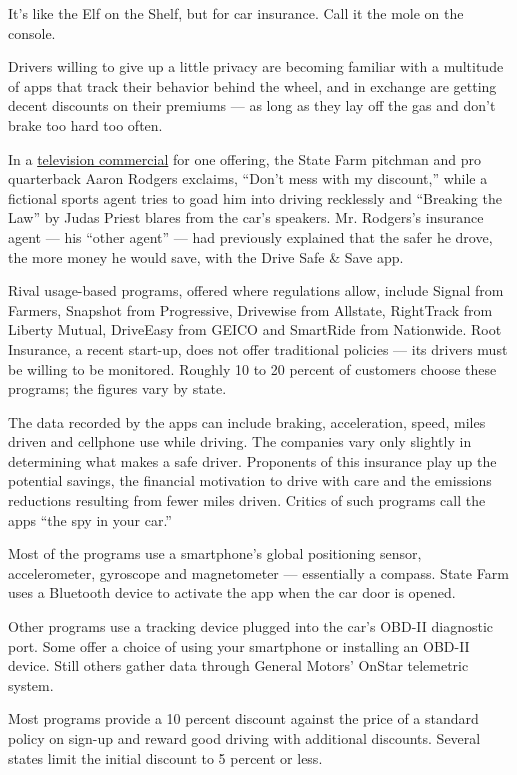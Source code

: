 It's like the Elf on the Shelf, but for car insurance. Call it the mole
on the console.

Drivers willing to give up a little privacy are becoming familiar with a
multitude of apps that track their behavior behind the wheel, and in
exchange are getting decent discounts on their premiums --- as long as
they lay off the gas and don't brake too hard too often.

In a
\href{https://www.ispot.tv/ad/ZAGx/state-farm-floor-it-featuring-aaron-rodgers-david-haydn-jones}{television
commercial} for one offering, the State Farm pitchman and pro
quarterback Aaron Rodgers exclaims, ``Don't mess with my discount,''
while a fictional sports agent tries to goad him into driving recklessly
and ``Breaking the Law'' by Judas Priest blares from the car's speakers.
Mr. Rodgers's insurance agent --- his ``other agent'' --- had previously
explained that the safer he drove, the more money he would save, with
the Drive Safe \& Save app.

Rival usage-based programs, offered where regulations allow, include
Signal from Farmers, Snapshot from Progressive, Drivewise from Allstate,
RightTrack from Liberty Mutual, DriveEasy from GEICO and SmartRide from
Nationwide. Root Insurance, a recent start-up, does not offer
traditional policies --- its drivers must be willing to be monitored.
Roughly 10 to 20 percent of customers choose these programs; the figures
vary by state.

The data recorded by the apps can include braking, acceleration, speed,
miles driven and cellphone use while driving. The companies vary only
slightly in determining what makes a safe driver. Proponents of this
insurance play up the potential savings, the financial motivation to
drive with care and the emissions reductions resulting from fewer miles
driven. Critics of such programs call the apps ``the spy in your car.''

Most of the programs use a smartphone's global positioning sensor,
accelerometer, gyroscope and magnetometer --- essentially a compass.
State Farm uses a Bluetooth device to activate the app when the car door
is opened.

Other programs use a tracking device plugged into the car's OBD-II
diagnostic port. Some offer a choice of using your smartphone or
installing an OBD-II device. Still others gather data through General
Motors' OnStar telemetric system.

Most programs provide a 10 percent discount against the price of a
standard policy on sign-up and reward good driving with additional
discounts. Several states limit the initial discount to 5 percent or
less.

